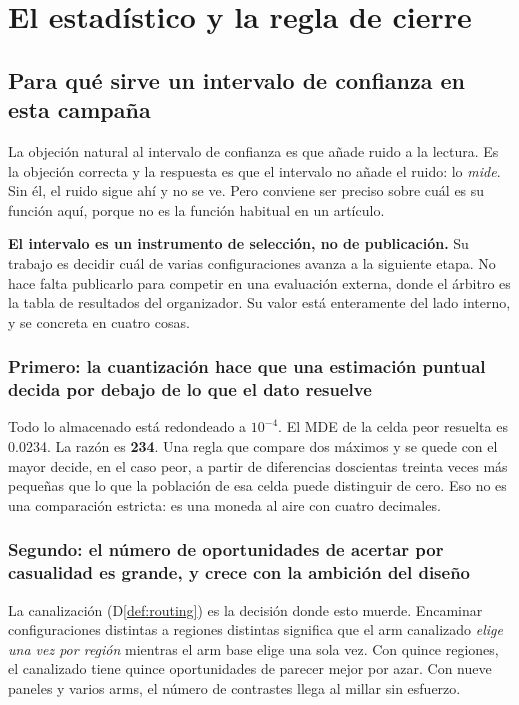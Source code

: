 \section{El estadístico y la regla de cierre}
\label{sec:estadistico}

\subsection{Para qué sirve un intervalo de confianza en esta campaña}

La objeción natural al intervalo de confianza es que añade ruido a la lectura. Es
la objeción correcta y la respuesta es que el intervalo no añade el ruido: lo
\emph{mide}. Sin él, el ruido sigue ahí y no se ve. Pero conviene ser preciso sobre
cuál es su función aquí, porque no es la función habitual en un artículo.

\textbf{El intervalo es un instrumento de selección, no de publicación.} Su
trabajo es decidir cuál de varias configuraciones avanza a la siguiente etapa. No
hace falta publicarlo para competir en una evaluación externa, donde el árbitro es
la tabla de resultados del organizador. Su valor está enteramente del lado
interno, y se concreta en cuatro cosas.

\subsubsection*{Primero: la cuantización hace que una estimación puntual decida
por debajo de lo que el dato resuelve}

Todo lo almacenado está redondeado a $10^{-4}$. El MDE de la celda peor resuelta es
0.0234. La razón es \textbf{234}. Una regla que compare dos máximos y se quede con
el mayor decide, en el caso peor, a partir de diferencias doscientas treinta veces
más pequeñas que lo que la población de esa celda puede distinguir de cero. Eso no
es una comparación estricta: es una moneda al aire con cuatro decimales.

\subsubsection*{Segundo: el número de oportunidades de acertar por casualidad es
grande, y crece con la ambición del diseño}

La canalización (D\ref{def:routing}) es la decisión donde esto muerde. Encaminar
configuraciones distintas a regiones distintas significa que el arm canalizado
\emph{elige una vez por región} mientras el arm base elige una sola vez. Con quince
regiones, el canalizado tiene quince oportunidades de parecer mejor por azar. Con
nueve paneles y varios arms, el número de contrastes llega al millar sin esfuerzo.


